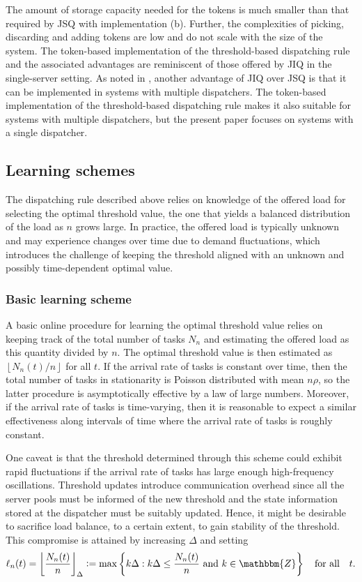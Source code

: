 \documentclass[a4paper, 12pt]{article}
\theoremstyle{definition}
\newcommand{\floor}[1]{\left\lfloor#1\right\rfloor}
\newcommand{\set}[2]{\left\{#1 : #2\right\}}
\newcommand{\defeq}{\vcentcolon=}
\newcommand{\Z}{\mathbbm{Z}}
\begin{document}
The amount of storage capacity needed for the tokens is much smaller than that required by JSQ with implementation (b). Further, the complexities of picking, discarding and adding tokens are low and do not scale with the size of the system. The token-based implementation of the threshold-based dispatching rule and the associated advantages are reminiscent of those offered by JIQ in the single-server setting. As noted in \cite{lu2011join}, another advantage of JIQ over JSQ is that it can be implemented in systems with multiple dispatchers. The token-based implementation of the threshold-based dispatching rule makes it also suitable for systems with multiple dispatchers, but the present paper focuses on systems with a single dispatcher.

\subsection{Learning schemes}
\label{sub: learning schemes}

The dispatching rule described above relies on knowledge of the offered load for selecting the optimal threshold value, the one that yields a balanced distribution of the load as $n$ grows large. In practice, the offered load is typically unknown and may experience changes over time due to demand fluctuations, which introduces the challenge of keeping the threshold aligned with an unknown and possibly time-dependent optimal value.

\subsubsection{Basic learning scheme}

A basic online procedure for learning the optimal threshold value relies on keeping track of the total number of tasks $N_n$ and estimating the offered load as this quantity divided by $n$. The optimal threshold value is then estimated as $\floor{N_n(t) / n}$ for all $t$. If the arrival rate of tasks is constant over time, then the total number of tasks in stationarity is Poisson distributed with mean $n\rho$, so the latter procedure is asymptotically effective by a law of large numbers. Moreover, if the arrival rate of tasks is time-varying, then it is reasonable to expect a similar effectiveness along intervals of time where the arrival rate of tasks is roughly constant.

One caveat is that the threshold determined through this scheme could exhibit rapid fluctuations if the arrival rate of tasks has large enough high-frequency oscillations. Threshold updates introduce communication overhead since all the server pools must be informed of the new threshold and the state information stored at the dispatcher must be suitably updated. Hence, it might be desirable to sacrifice load balance, to a certain extent, to gain stability of the threshold. This compromise is attained by increasing $\Delta$ and setting
\begin{equation*}
	\ell_n(t) = \floor{\frac{N_n(t)}{n}}_\Delta \defeq \max \set{k \Delta}{k \Delta \leq \frac{N_n(t)}{n}\ \text{and}\ k \in \Z} \quad \text{for all} \quad t.
\end{equation*}
\end{document}
